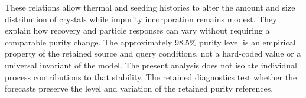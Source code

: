 \documentclass[10pt,a4paper]{article}
\begin{document}
These relations allow thermal and seeding histories to alter the amount and size distribution of crystals while impurity incorporation remains modest. They explain how recovery and particle responses can vary without requiring a comparable purity change. The approximately 98.5\% purity level is an empirical property of the retained source and query conditions, not a hard-coded value or a universal invariant of the model. The present analysis does not isolate individual process contributions to that stability. The retained diagnostics test whether the forecasts preserve the level and variation of the retained purity references.
\end{document}
